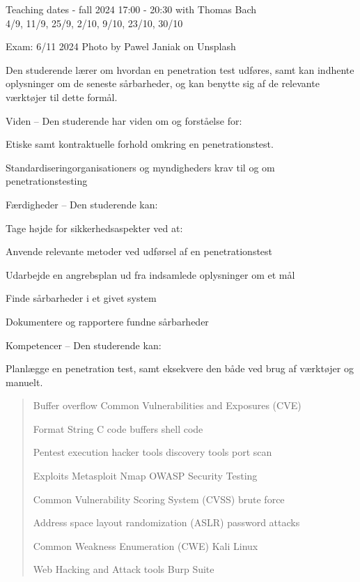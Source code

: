 \documentclass[Screen16to9,17pt]{foils}
\begin{document}
Teaching dates - fall 2024 17:00 - 20:30 with Thomas Bach\\
4/9, 11/9, 25/9, 2/10, 9/10, 23/10, 30/10

Exam: 6/11 2024 \hskip 12cm Photo by Pawel Janiak on Unsplash



Den studerende lærer om hvordan en penetration test udføres, samt kan indhente oplysninger om de
seneste sårbarheder, og kan benytte sig af de relevante værktøjer til dette formål.

\begin{list2}
\item[] Viden -- Den studerende har viden om og forståelse for:
\item Etiske samt kontraktuelle forhold omkring en penetrationstest.
\item Standardiseringorganisationers og myndigheders krav til og om penetrationstesting
\item[] Færdigheder -- Den studerende kan:
\item[] Tage højde for sikkerhedsaspekter ved at:
\item Anvende relevante metoder ved udførsel af en penetrationstest
\item Udarbejde en angrebsplan ud fra indsamlede oplysninger om et mål
\item Finde sårbarheder i et givet system
\item Dokumentere og rapportere fundne sårbarheder
\item[] Kompetencer -- Den studerende kan:
\item Planlægge en penetration test, samt eksekvere den både ved brug af værktøjer og manuelt.
\end{list2}



\begin{quote}\Large
Buffer overflow  Common Vulnerabilities and Exposures (CVE)

Format String   C code   buffers  shell code

Pentest execution   hacker tools  discovery tools   port scan

Exploits  Metasploit  Nmap   OWASP Security Testing

Common Vulnerability Scoring System (CVSS)   brute force

Address space layout randomization (ASLR)    password attacks

Common Weakness Enumeration (CWE)   Kali Linux

Web Hacking and Attack tools   Burp Suite
\end{quote}
\end{document}
